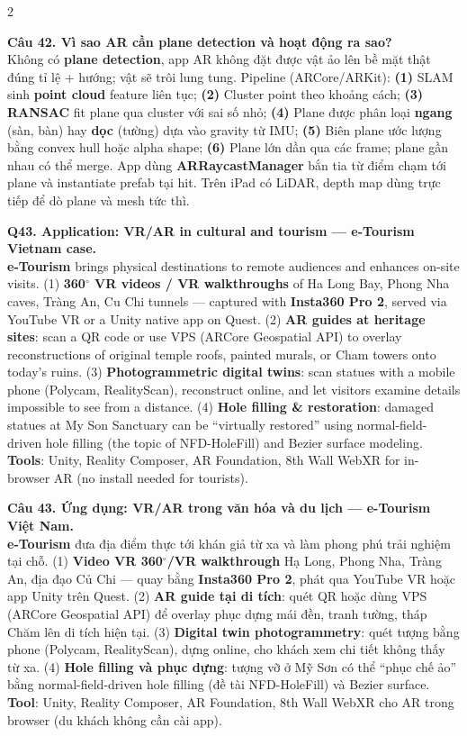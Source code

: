 \begin{paracol}{2}
\switchcolumn

\textbf{Câu 42. Vì sao AR cần plane detection và hoạt động ra sao?}\\
Không có \textbf{plane detection}, app AR không đặt được vật ảo lên bề mặt thật đúng tỉ lệ + hướng; vật sẽ trôi lung tung. Pipeline (ARCore/ARKit): \textbf{(1)} SLAM sinh \textbf{point cloud} feature liên tục; \textbf{(2)} Cluster point theo khoảng cách; \textbf{(3)} \textbf{RANSAC} fit plane qua cluster với sai số nhỏ; \textbf{(4)} Plane được phân loại \textbf{ngang} (sàn, bàn) hay \textbf{dọc} (tường) dựa vào gravity từ IMU; \textbf{(5)} Biên plane ước lượng bằng convex hull hoặc alpha shape; \textbf{(6)} Plane lớn dần qua các frame; plane gần nhau có thể merge. App dùng \textbf{ARRaycastManager} bắn tia từ điểm chạm tới plane và instantiate prefab tại hit. Trên iPad có LiDAR, depth map dùng trực tiếp để dò plane và mesh tức thì.

\switchcolumn*

\textbf{Q43. Application: VR/AR in cultural and tourism --- e-Tourism Vietnam case.}\\
\textbf{e-Tourism} brings physical destinations to remote audiences and enhances on-site visits. (1) \textbf{360$^\circ$ VR videos / VR walkthroughs} of Ha Long Bay, Phong Nha caves, Tr{\`a}ng An, Cu Chi tunnels --- captured with \textbf{Insta360 Pro 2}, served via YouTube VR or a Unity native app on Quest. (2) \textbf{AR guides at heritage sites}: scan a QR code or use VPS (ARCore Geospatial API) to overlay reconstructions of original temple roofs, painted murals, or Cham towers onto today's ruins. (3) \textbf{Photogrammetric digital twins}: scan statues with a mobile phone (Polycam, RealityScan), reconstruct online, and let visitors examine details impossible to see from a distance. (4) \textbf{Hole filling \& restoration}: damaged statues at My Son Sanctuary can be ``virtually restored'' using normal-field-driven hole filling (the topic of NFD-HoleFill) and Bezier surface modeling. \textbf{Tools}: Unity, Reality Composer, AR Foundation, 8th Wall WebXR for in-browser AR (no install needed for tourists).

\switchcolumn

\textbf{Câu 43. Ứng dụng: VR/AR trong văn hóa và du lịch --- e-Tourism Việt Nam.}\\
\textbf{e-Tourism} đưa địa điểm thực tới khán giả từ xa và làm phong phú trải nghiệm tại chỗ. (1) \textbf{Video VR 360$^\circ$/VR walkthrough} Hạ Long, Phong Nha, Tràng An, địa đạo Củ Chi --- quay bằng \textbf{Insta360 Pro 2}, phát qua YouTube VR hoặc app Unity trên Quest. (2) \textbf{AR guide tại di tích}: quét QR hoặc dùng VPS (ARCore Geospatial API) để overlay phục dựng mái đền, tranh tường, tháp Chăm lên di tích hiện tại. (3) \textbf{Digital twin photogrammetry}: quét tượng bằng phone (Polycam, RealityScan), dựng online, cho khách xem chi tiết không thấy từ xa. (4) \textbf{Hole filling và phục dựng}: tượng vỡ ở Mỹ Sơn có thể ``phục chế ảo'' bằng normal-field-driven hole filling (đề tài NFD-HoleFill) và Bezier surface. \textbf{Tool}: Unity, Reality Composer, AR Foundation, 8th Wall WebXR cho AR trong browser (du khách không cần cài app).


\end{paracol}
